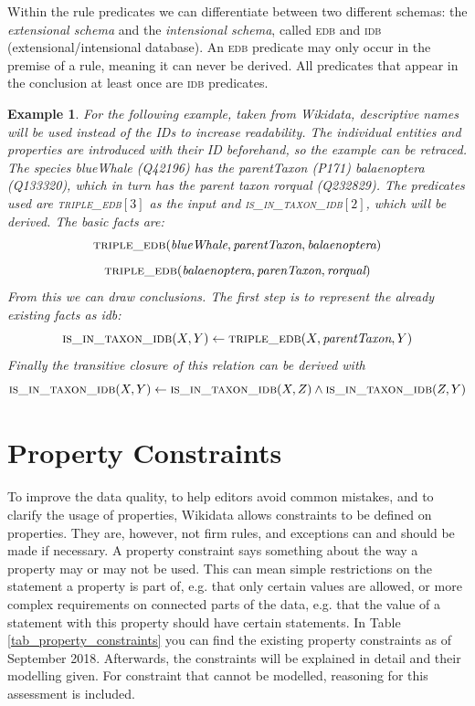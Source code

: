 \documentclass[hyperref,bachelorofscience,fleqn]{cgvpub}
\newtheorem{example}{Example}
\begin{document}
Within the rule predicates we can differentiate between two different schemas: the \emph{extensional schema} and the \emph{intensional schema}, called \textsc{edb} and \textsc{idb} (extensional/intensional database). An \textsc{edb} predicate may only occur in the premise of a rule, meaning it can never be derived. All predicates that appear in the conclusion at least once are \textsc{idb} predicates.

\begin{example}
For the following example, taken from Wikidata, descriptive names will be used instead of the IDs to increase readability. The individual entities and properties are introduced with their ID beforehand, so the example can be retraced. The species \emph{blueWhale} (Q42196) has the \emph{parentTaxon} (P171) \emph{balaenoptera} (Q133320), which in turn has the parent taxon \emph{rorqual} (Q232829). The predicates used are \textsc{triple\_edb}\([3]\) as the input and \textsc{is\_in\_taxon\_idb}\([2]\), which will be derived. The basic facts are:
\[\textsc{triple\_edb}(\emph{blueWhale}, \emph{parentTaxon}, \emph{balaenoptera})\]
\[\textsc{triple\_edb}(\emph{balaenoptera}, \emph{parenTaxon}, \emph{rorqual})\]
From this we can draw conclusions. The first step is to represent the already existing facts as idb:
\[\textsc{is\_in\_taxon\_idb}(X, Y) \leftarrow \textsc{triple\_edb}(X, \emph{parentTaxon}, Y)\]
Finally the transitive closure of this relation can be derived with
\[\textsc{is\_in\_taxon\_idb}(X, Y) \leftarrow \textsc{is\_in\_taxon\_idb}(X, Z) \wedge \textsc{is\_in\_taxon\_idb}(Z, Y)\]
\end{example}

\chapter{Property Constraints}\label{cha_property_constraints}

To improve the data quality, to help editors avoid common mistakes, and to clarify the usage of properties, Wikidata allows constraints to be defined on properties. They are, however, not firm rules, and exceptions can and should be made if necessary. A property constraint says something about the way a property may or may not be used. This can mean simple restrictions on the statement a property is part of, e.g. that only certain values are allowed, or more complex requirements on connected parts of the data, e.g. that the value of a statement with this property should have certain statements. In Table \ref{tab_property_constraints} you can find the existing property constraints as of September 2018. Afterwards, the constraints will be explained in detail and their modelling given. For constraint that cannot be modelled, reasoning for this assessment is included.
\end{document}
